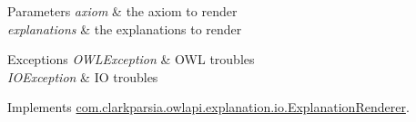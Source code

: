 \begin{DoxyParams}{Parameters}
{\em axiom} & the axiom to render \\
\hline
{\em explanations} & the explanations to render \\
\hline
\end{DoxyParams}

\begin{DoxyExceptions}{Exceptions}
{\em O\-W\-L\-Exception} & O\-W\-L troubles \\
\hline
{\em I\-O\-Exception} & I\-O troubles \\
\hline
\end{DoxyExceptions}


Implements \hyperlink{interfacecom_1_1clarkparsia_1_1owlapi_1_1explanation_1_1io_1_1_explanation_renderer_aa3ad85b6087301d6ff3f4473bae1afda}{com.\-clarkparsia.\-owlapi.\-explanation.\-io.\-Explanation\-Renderer}.


